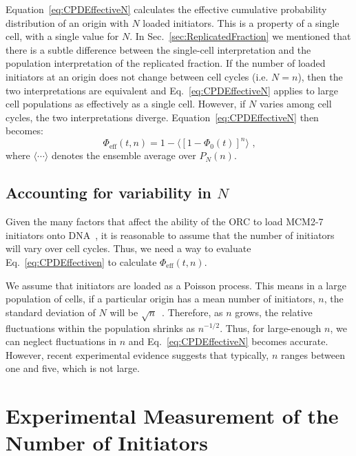 {		Equation~\ref{eq:CPDEffectiveN} calculates the effective cumulative probability distribution of an origin with $N$ loaded initiators.
		This is a property of a single cell, with a single value for $N$.
		In Sec.~\ref{sec:ReplicatedFraction} we mentioned that there is a subtle difference between the single-cell interpretation and the population interpretation of the replicated fraction.
		If the number of loaded initiators at an origin does not change between cell cycles (i.e. $N=n$), then the two interpretations are equivalent and Eq.~\ref{eq:CPDEffectiveN} applies to large cell populations as effectively as a single cell.
		However, if $N$ varies among cell cycles, the two interpretations diverge.
		Equation~\ref{eq:CPDEffectiveN} then becomes:
		\begin{equation} \label{eq:CPDEffectiven}
			\Phi_{\text{eff}}(t,n) = 1 - \langle\left[1 - \Phi_0(t)\right]^n\rangle\text{ ,}
		\end{equation}
		where $\langle \cdots \rangle$ denotes the ensemble average over $P_N(n)$.
		
		
		\subsection{Accounting for variability in $N$}
		\label{subsec:VariableN}
		
		Given the many factors that affect the ability of the ORC to load MCM2-7 initiators onto DNA~\cite{MultiMCM}, it is reasonable to assume that the number of initiators will vary over cell cycles.
		Thus, we need a way to evaluate Eq.~\ref{eq:CPDEffectiven} to calculate $\Phi_\text{eff}(t,n)$.
		
		We assume that initiators are loaded as a Poisson process.
		This means in a large population of cells, if a particular origin has a mean number of initiators, $n$, the standard deviation of $N$ will be $\sqrt{n}$~\cite{cowan}.
		Therefore, as $n$ grows, the relative fluctuations within the population shrinks as $n^{-1/2}$.
		Thus, for large-enough $n$, we can neglect fluctuations in $n$ and Eq.~\ref{eq:CPDEffectiveN} becomes accurate.
		However, recent experimental evidence suggests that typically, $n$ ranges between one and five, which is not large.
		
	\section{Experimental Measurement of the Number of Initiators}
	\label{sec:ExperimentsMIM}
	
}
